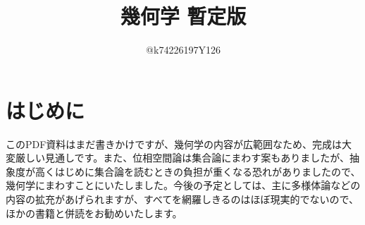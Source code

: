 \documentclass[10pt,a4paper,titlepage]{jsarticle}
\title{幾何学 暫定版}
\author{@k74226197Y126}
\begin{document}
\maketitle
{}
\section*{はじめに}
\par
このPDF資料はまだ書きかけですが、幾何学の内容が広範囲なため、完成は大変厳しい見通しです。また、位相空間論は集合論にまわす案もありましたが、抽象度が高くはじめに集合論を読むときの負担が重くなる恐れがありましたので、幾何学にまわすことにいたしました。今後の予定としては、主に多様体論などの内容の拡充があげられますが、すべてを網羅しきるのはほぼ現実的でないので、ほかの書籍と併読をお勧めいたします。
\tableofcontents
\clearpage
{}


\clearpage

\clearpage

\clearpage

\clearpage

\clearpage

\clearpage

\clearpage

\clearpage

\clearpage

\clearpage


\clearpage

\clearpage

\clearpage

\clearpage

\clearpage

\clearpage


\end{document}

